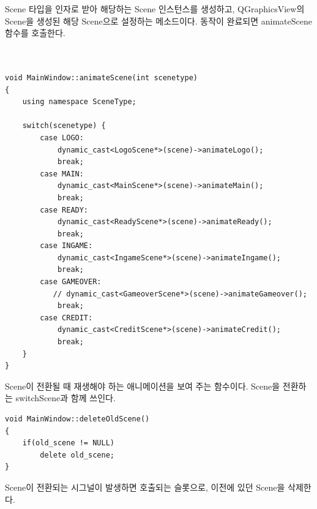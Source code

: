 \documentclass[10pt,oneside,a4paper,titlepage]{article}
\begin{document}
Scene 타입을 인자로 받아 해당하는 Scene 인스턴스를 생성하고, QGraphicsView의 Scene을 생성된 해당 Scene으로 설정하는 메소드이다. 동작이 완료되면 animateScene 함수를 호출한다.\\ \\

\begin{lstlisting}[caption={MainWindow animateScene}]

void MainWindow::animateScene(int scenetype)
{
    using namespace SceneType;

    switch(scenetype) {
        case LOGO:
            dynamic_cast<LogoScene*>(scene)->animateLogo();
            break;
        case MAIN:
            dynamic_cast<MainScene*>(scene)->animateMain();
            break;
        case READY:
            dynamic_cast<ReadyScene*>(scene)->animateReady();
            break;
        case INGAME:
            dynamic_cast<IngameScene*>(scene)->animateIngame();
            break;
        case GAMEOVER:
           // dynamic_cast<GameoverScene*>(scene)->animateGameover();
            break;
        case CREDIT:
            dynamic_cast<CreditScene*>(scene)->animateCredit();
            break;
    }
}
\end{lstlisting}

Scene이 전환될 때 재생해야 하는 애니메이션을 보여 주는 함수이다. Scene을 전환하는 switchScene과 함께 쓰인다.\\

\begin{lstlisting}[caption={MainWindow deleteOldScene}]
void MainWindow::deleteOldScene()
{
    if(old_scene != NULL)
        delete old_scene;
}
\end{lstlisting}

Scene이 전환되는 시그널이 발생하면 호출되는 슬롯으로, 이전에 있던 Scene을 삭제한다.\\
\end{document}
